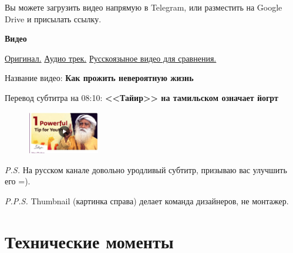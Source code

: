 \documentclass[
a4paper, %
12pt, %
article,
onecolumn, %
openany, %
]{memoir}
\begin{document}
Вы можете загрузить видео напрямую в Telegram, или разместить
на Google Drive и присылать ссылку.

\begin{center} \textbf{Видео} \end{center}
\href{https://www.youtube.com/watch?v=9sGJUR7stzc}{Оригинал.}
\quad
\href{https://drive.google.com/file/d/1Y6ECjMSvkaUFmNawIePfFvqS2ZnB3SPi/view?usp=sharing}{Аудио трек.}
\quad
\href{https://www.youtube.com/watch?v=Q3NYDF4JyTg}{Русскоязыное видео для сравнения.}

Название видео: \textbf{Как прожить невероятную жизнь}

Перевод субтитра на 08:10: \textbf{<<Тайир>> на тамильском означает йогрт}


\begin{figure}
    \begin{center}
        \includegraphics[width=0.28\textwidth]{thumbnail}
    \end{center}
\end{figure}

\emph{P.S.} На русском канале довольно уродливый субтитр, призываю вас улучшить его =).

\emph{P.P.S.} Thumbnail (картинка справа) делает команда дизайнеров, не монтажер.


\newpage
\section{Технические моменты}
\end{document}
